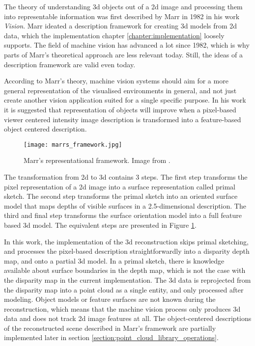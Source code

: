 \documentclass[12pt,a4paper,oneside,pdftex]{report}
\begin{document}
The theory of understanding 3d objects out of a 2d image and processing them into representable information was first described by Marr in 1982 in his work \emph{Vision}. Marr ideated a description framework for creating 3d models from 2d data, which the implementation chapter \ref{chapter:implementation} loosely supports. The field of machine vision has advanced a lot since 1982, which is why parts of Marr's theoretical approach are less relevant today. Still, the ideas of a description framework are valid even today.

According to Marr's theory, machine vision systems should aim for a more general representation of the visualised environments in general, and not just create another vision application suited for a single specific purpose. In his work it is suggested that representation of objects will improve when a pixel-based viewer centered intensity image description is transformed into a feature-based object centered description.

\begin{figure}[ht]
  \begin{center}
    \texttt{[image: marrs\_framework.jpg]}
    \caption{Marr's representational framework. Image from \citep{Marr82}.}
    \label{fig:marrs_framework}
  \end{center}
\end{figure}

The transformation from 2d to 3d contains 3 steps. The first step transforms the pixel representation of a 2d image into a surface representation called primal sketch. The second step transforms the primal sketch into an oriented surface model that maps depths of visible surfaces in a 2.5-dimensional description. The third and final step transforms the surface orientation model into a full feature based 3d model. The equivalent steps are presented in Figure \ref{fig:marrs_framework}.

In this work, the implementation of the 3d reconstruction skips primal sketching, and processes the pixel-based description straightforwardly into a disparity depth map, and onto a partial 3d model. In a primal sketch, there is knowledge available about surface boundaries in the depth map, which is not the case with the disparity map in the current implementation. The 3d data is reprojected from the disparity map into a point cloud as a single entity, and only processed after modeling. Object models or feature surfaces are not known during the reconstruction, which means that the machine vision process only produces 3d data and does not track 2d image features at all. The object-centered descriptions of the reconstructed scene described in Marr's framework are partially implemented later in section \ref{section:point_cloud_library_operations}.
\end{document}
